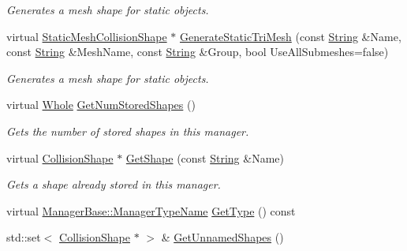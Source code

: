\begin{DoxyCompactItemize}
\begin{DoxyCompactList}\small\item\em Generates a mesh shape for static objects. \item\end{DoxyCompactList}\item 
virtual \hyperlink{classphys_1_1StaticMeshCollisionShape}{StaticMeshCollisionShape} $\ast$ \hyperlink{classphys_1_1CollisionShapeManager_afb683cd65e6d43940c5ac24742625a1d}{GenerateStaticTriMesh} (const \hyperlink{namespacephys_aa03900411993de7fbfec4789bc1d392e}{String} \&Name, const \hyperlink{namespacephys_aa03900411993de7fbfec4789bc1d392e}{String} \&MeshName, const \hyperlink{namespacephys_aa03900411993de7fbfec4789bc1d392e}{String} \&Group, bool UseAllSubmeshes=false)
\begin{DoxyCompactList}\small\item\em Generates a mesh shape for static objects. \item\end{DoxyCompactList}\item 
virtual \hyperlink{namespacephys_a460f6bc24c8dd347b05e0366ae34f34a}{Whole} \hyperlink{classphys_1_1CollisionShapeManager_a97231768ed68d3741f81f57eb4944897}{GetNumStoredShapes} ()
\begin{DoxyCompactList}\small\item\em Gets the number of stored shapes in this manager. \item\end{DoxyCompactList}\item 
virtual \hyperlink{classphys_1_1CollisionShape}{CollisionShape} $\ast$ \hyperlink{classphys_1_1CollisionShapeManager_af80bc65c703520a3a3c2d5345cca50e3}{GetShape} (const \hyperlink{namespacephys_aa03900411993de7fbfec4789bc1d392e}{String} \&Name)
\begin{DoxyCompactList}\small\item\em Gets a shape already stored in this manager. \item\end{DoxyCompactList}\item 
virtual \hyperlink{classphys_1_1ManagerBase_aaa6ccddf23892eaccb898529414f80a5}{ManagerBase::ManagerTypeName} \hyperlink{classphys_1_1CollisionShapeManager_a046c14461ef78c2764ba7b149ba58e67}{GetType} () const 
\item 
std::set$<$ \hyperlink{classphys_1_1CollisionShape}{CollisionShape} $\ast$ $>$ \& \hyperlink{classphys_1_1CollisionShapeManager_a5bf8986d80af540a3769639425ef9891}{GetUnnamedShapes} ()

\end{DoxyCompactItemize}
